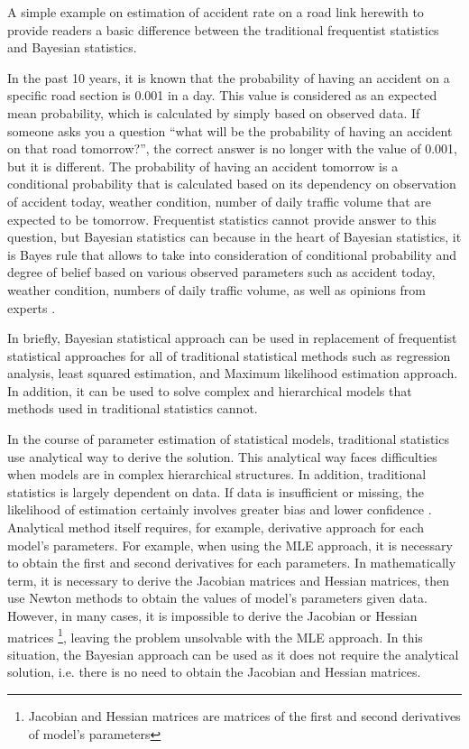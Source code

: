 A simple example on estimation of accident rate on a road link herewith to provide readers a basic difference between the traditional frequentist statistics and Bayesian statistics. 

In the past 10 years, it is known that the probability of having an accident on a specific road section is 0.001 in a day. This value is considered as an expected mean probability, which is calculated by simply based on observed data. If someone asks you a question ``what will be the probability of having an accident on that road tomorrow?'', the correct answer is no longer with the value of 0.001, but it is different. The probability of having an accident tomorrow is a conditional probability that is calculated based on its dependency on observation of accident today, weather condition, number of daily traffic volume that are expected to be tomorrow. Frequentist statistics cannot provide answer to this question, but Bayesian statistics can because in the heart of Bayesian statistics, it is Bayes rule that allows to take into consideration of conditional probability and degree of belief based on various observed parameters such as accident today, weather condition, numbers of daily traffic volume, as well as opinions from experts \citep{Andrew2006}.

In briefly, Bayesian statistical approach can be used in replacement of frequentist statistical approaches for all of traditional statistical methods such as regression analysis, least squared estimation, and Maximum likelihood estimation approach. In addition, it can be used to solve complex and hierarchical models that methods used in traditional statistics cannot. 

In the course of parameter estimation of statistical models, traditional statistics use analytical way to derive the solution. This analytical way faces difficulties when models are in complex hierarchical structures. In addition, traditional statistics is largely dependent on data. If data is insufficient or missing, the likelihood of estimation certainly involves greater bias and lower confidence \citep{Andrew2006,jeffgill}. Analytical method itself requires, for example, derivative approach for each model's parameters. For example, when using the MLE approach, it is necessary to obtain the first and second derivatives for each parameters. In mathematically term, it is necessary to derive the Jacobian matrices and Hessian matrices, then use Newton methods to obtain the values of model's parameters given data. However, in many cases, it is impossible to derive the Jacobian or Hessian matrices \footnote{Jacobian and Hessian matrices are matrices of the first and second derivatives of model's parameters}, leaving the problem unsolvable with the MLE approach. In this situation, the Bayesian approach can be used as it does not require the analytical solution, i.e. there is no need to obtain the Jacobian and Hessian matrices.

